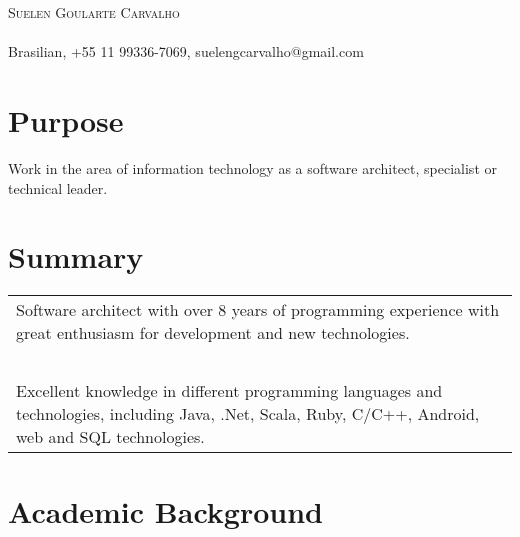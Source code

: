 \documentclass[a4paper, oneside, final]{scrartcl}
\begin{document}
\begin{center}
\textsc{\Huge{Suelen Goularte Carvalho}}\\
\ \\
Brasilian, +55 11 99336-7069, suelengcarvalho@gmail.com


\section{Purpose}
	Work in the area of information technology as a software architect, specialist or technical leader.



\section{Summary}

\begin{tabularx}{0.97\linewidth}{X}
	Software architect with over 8 years of programming experience with great enthusiasm for development and new technologies. \\ \ \\
	
	Excellent knowledge in different programming languages and technologies, including Java, .Net, Scala, Ruby, C/C++, Android, web and SQL technologies.
\end{tabularx}

\section{Academic Background}


\end{center}
\end{document}

